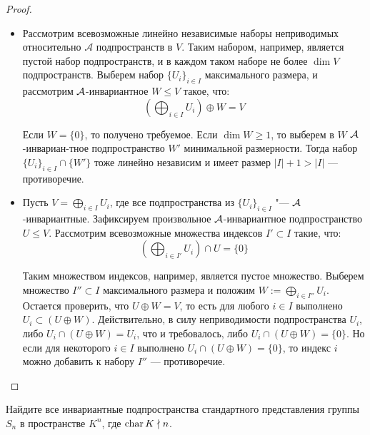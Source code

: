 \begin{proof}~
	\begin{itemize}
		\item{}Рассмотрим всевозможные линейно независимые наборы неприводимых относительно $\mathcal A$ подпространств в $V$. Таким набором, например, является пустой набор подпространств, и в каждом таком наборе не более $\dim{V}$ подпространств. Выберем набор $\{U_i\}_{i \in I}$ максимального размера, и рассмотрим $\mathcal A$-инвариантное $W \le V$ такое, что:
		\[\left(\bigoplus_{i \in I}U_i\right) \oplus W = V\]
		
		Если $W = \{0\}$, то получено требуемое. Если $\dim W \ge 1$, то выберем в $W$ $\mathcal A$-инвариан-тное подпространство $W'$ минимальной размерности. Тогда набор $\{U_i\}_{i \in I} \cap \{W'\}$ тоже линейно независим и имеет размер $|I| + 1  > |I|$ --- противоречие.
		
		\item{}Пусть $V = \bigoplus_{i \in I}U_i$, где все подпространства из $\{U_i\}_{i \in I}$ "--- $\mathcal A$-инвариантные. Зафиксируем произвольное $\mathcal A$-инвариантное подпространство $U \le V$. Рассмотрим всевозможные множества индексов $I' \subset I$ такие, что:
		\[\left(\bigoplus_{i \in I'}U_i\right) \cap U = \{0\}\]
		
		Таким множеством индексов, например, является пустое множество. Выберем множество $I'' \subset I$ максимального размера и положим $W := \bigoplus_{i \in I''}U_i$. Остается проверить, что $U \oplus W = V$, то есть для любого $i \in I$ выполнено $U_i \subset (U \oplus W)$. Действительно, в силу неприводимости подпространства $U_i$, либо $U_i \cap (U \oplus W) = U_i$, что и требовалось, либо $U_i \cap (U \oplus W) = \{0\}$. Но если для некоторого $i \in I$ выполнено $U_i \cap (U \oplus W) = \{0\}$, то индекс $i$ можно добавить к набору $I''$ --- противоречие.\qedhere
	\end{itemize}
\end{proof}

\begin{problem}
	Найдите все инвариантные подпространства стандартного представления группы $S_n$ в пространстве $K^n$, где $\operatorname{char}{K} \nmid n$.
\end{problem}

